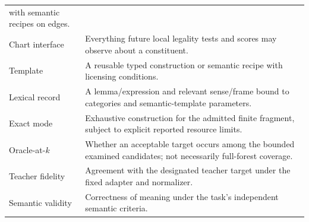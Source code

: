 \documentclass[11pt,a4paper]{article}
\begin{document}
\begin{longtable}{L{34mm}L{114mm}}
with semantic recipes on edges. \\
Chart interface & Everything future local legality tests and scores may
observe about a constituent. \\
Template & A reusable typed construction or semantic recipe with licensing
conditions. \\
Lexical record & A lemma/expression and relevant sense/frame bound to
categories and semantic-template parameters. \\
Exact mode & Exhaustive construction for the admitted finite fragment,
subject to explicit reported resource limits. \\
Oracle-at-\(k\) & Whether an acceptable target occurs among the bounded
examined candidates; not necessarily full-forest coverage. \\
Teacher fidelity & Agreement with the designated teacher target under
the fixed adapter and normalizer. \\
Semantic validity & Correctness of meaning under the task's independent
semantic criteria. \\
\bottomrule
\end{longtable}
\end{document}
